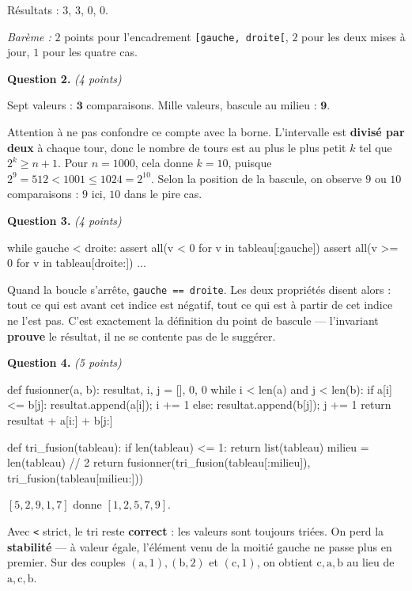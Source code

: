 Résultats : $3$, $3$, $0$, $0$.

\medskip
\emph{Barème :} $2$ points pour l'encadrement \lstinline{[gauche, droite[},
$2$ pour les deux mises à jour, $1$ pour les quatre cas.

\medskip
\textbf{Question 2.} \emph{(4 points)}

Sept valeurs : $\mathbf{3}$ comparaisons. Mille valeurs, bascule au milieu :
$\mathbf{9}$.

Attention à ne pas confondre ce compte avec la borne. L'intervalle est
\textbf{divisé par deux} à chaque tour, donc le nombre de tours est au plus le
plus petit $k$ tel que $2^{k} \geqslant n + 1$. Pour $n = 1000$, cela donne
$k = 10$, puisque $2^{9} = 512 < 1001 \leqslant 1024 = 2^{10}$. Selon la
position de la bascule, on observe $9$ ou $10$ comparaisons : $9$ ici, $10$
dans le pire cas.

\medskip
\textbf{Question 3.} \emph{(4 points)}

\begin{python}
while gauche < droite:
    assert all(v < 0 for v in tableau[:gauche])
    assert all(v >= 0 for v in tableau[droite:])
    ...
\end{python}

Quand la boucle s'arrête, \lstinline{gauche == droite}. Les deux propriétés
disent alors : tout ce qui est avant cet indice est négatif, tout ce qui est à
partir de cet indice ne l'est pas. C'est exactement la définition du point de
bascule — l'invariant \textbf{prouve} le résultat, il ne se contente pas de le
suggérer.

\medskip
\textbf{Question 4.} \emph{(5 points)}

\begin{python}
def fusionner(a, b):
    resultat, i, j = [], 0, 0
    while i < len(a) and j < len(b):
        if a[i] <= b[j]:
            resultat.append(a[i]); i += 1
        else:
            resultat.append(b[j]); j += 1
    return resultat + a[i:] + b[j:]

def tri_fusion(tableau):
    if len(tableau) <= 1:
        return list(tableau)
    milieu = len(tableau) // 2
    return fusionner(tri_fusion(tableau[:milieu]),
                     tri_fusion(tableau[milieu:]))
\end{python}

$[5, 2, 9, 1, 7]$ donne $[1, 2, 5, 7, 9]$.

Avec \lstinline{<} strict, le tri reste \textbf{correct} : les valeurs sont
toujours triées. On perd la \textbf{stabilité} — à valeur égale, l'élément
venu de la moitié gauche ne passe plus en premier. Sur des couples
$(\text{a}, 1), (\text{b}, 2)$ et $(\text{c}, 1)$, on obtient
$\text{c}, \text{a}, \text{b}$ au lieu de $\text{a}, \text{c}, \text{b}$.

